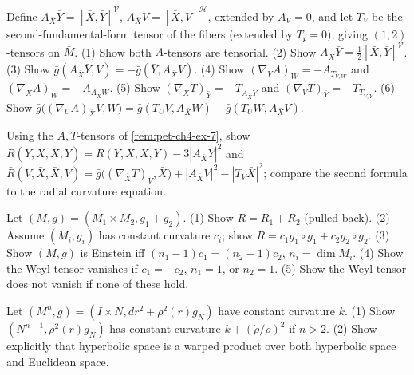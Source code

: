 \begin{remark}
  \label{rem:pet-ch4-ex-7}
  Define $A_{\bar X}\bar Y=[\bar X,\bar Y]^{\mathcal V}$,
  $A_{\bar X}V=[\bar X,V]^{\mathcal H}$, extended by $A_V=0$, and let $T_V$ be
  the second-fundamental-form tensor of the fibers (extended by
  $T_{\mathfrak x}=0$), giving $(1,2)$-tensors on $\bar M$. (1) Show both
  $A$-tensors are tensorial. (2) Show
  $A_{\bar X}\bar Y=\tfrac12[\bar X,\bar Y]^{\mathcal V}$. (3) Show
  $\bar g(A_{\bar X}\bar Y,V)=-\bar g(\bar Y,A_{\bar X}V)$. (4) Show
  $(\nabla_VA)_W=-A_{T_{V,W}}$ and $(\nabla_{\bar X}A)_W=-A_{A_{\bar X}W}$.
  (5) Show $(\nabla_{\bar X}T)_{\bar Y}=-T_{A_{\bar X}\bar Y}$ and
  $(\nabla_VT)_{\bar Y}=-T_{T_{V,\bar Y}}$. (6) Show
  $\bar g\big((\nabla_UA)_{\bar X}V,W\big)=\bar g(T_UV,A_{\bar X}W)-\bar g(T_UW,A_{\bar X}V)$.
\end{remark}

\begin{remark}
  \label{rem:pet-ch4-ex-8}
  Using the $A,T$-tensors of \cref{rem:pet-ch4-ex-7}, show
  $\bar R(\bar Y,\bar X,\bar X,\bar Y)=R(Y,X,X,Y)-3|A_{\bar X}\bar Y|^2$ and
  $\bar R(V,\bar X,\bar X,V)=\bar g\big((\nabla_{\bar X}T)_V,\bar X\big)+|A_{\bar X}V|^2-|T_V\bar X|^2$;
  compare the second formula to the radial curvature equation.
\end{remark}

\begin{remark}
  \label{rem:pet-ch4-ex-9}
  Let $(M,g)=(M_1\times M_2,g_1+g_2)$. (1) Show $R=R_1+R_2$ (pulled back). (2)
  Assume $(M_i,g_i)$ has constant curvature $c_i$; show $R=c_1g_1\circ g_1+c_2g_2\circ g_2$.
  (3) Show $(M,g)$ is Einstein iff $(n_1-1)c_1=(n_2-1)c_2$, $n_i=\dim M_i$. (4)
  Show the Weyl tensor vanishes if $c_1=-c_2$, $n_1=1$, or $n_2=1$. (5) Show
  the Weyl tensor does not vanish if none of these hold.
\end{remark}

\begin{remark}
  \label{rem:pet-ch4-ex-10}
  Let $(M^n,g)=(I\times N,dr^2+\rho^2(r)g_N)$ have constant curvature $k$. (1)
  Show $(N^{n-1},\rho^2(r)g_N)$ has constant curvature $k+(\dot\rho/\rho)^2$ if
  $n>2$. (2) Show explicitly that hyperbolic space is a warped product over
  both hyperbolic space and Euclidean space.
\end{remark}

